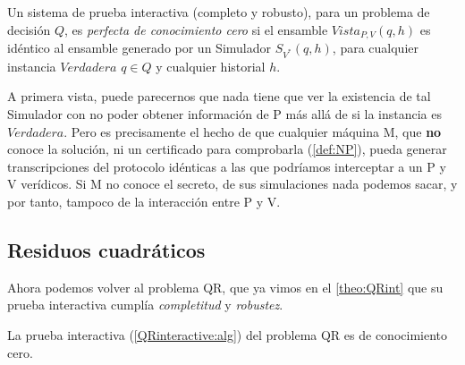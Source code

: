 \begin{definition}
	\hfil
	
	Un sistema de prueba interactiva (completo y robusto), para un problema de decisión $Q$, es \textit{perfecta de conocimiento cero} si el ensamble $Vista_{P,V}(q,h)$ es idéntico al ensamble generado por un Simulador $S_{V^*}(q,h)$, para cualquier instancia $Verdadera$ $q\in Q$ y cualquier historial $h$.
\end{definition}



A primera vista, puede parecernos que nada tiene que ver la existencia de tal Simulador con no poder obtener información de P más allá de si la instancia es $Verdadera$. Pero es precisamente el hecho de que cualquier máquina M, que \textbf{no} conoce la solución, ni un certificado para comprobarla (\ref{def:NP}), pueda generar transcripciones del protocolo idénticas a las que podríamos interceptar a un P y V verídicos. Si M no conoce el secreto, de sus simulaciones nada podemos sacar, y por tanto, tampoco de la interacción entre P y V.



\hfil

\subsection{Residuos cuadráticos}

Ahora podemos volver al problema QR, que ya vimos en el \autoref{theo:QRint} que su prueba interactiva cumplía \textit{completitud} y \textit{robustez}.

\begin{theorem}
	La prueba interactiva (\ref{QRinteractive:alg}) del problema QR es de conocimiento cero.
\end{theorem}

